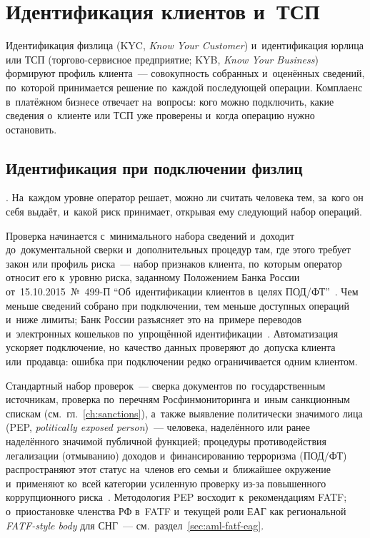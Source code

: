 
\chapter{Идентификация клиентов и~ТСП}\label{ch:kyc-kyb}
Идентификация физлица (KYC, \textit{Know Your Customer}) и~идентификация юрлица
или ТСП (торгово-сервисное предприятие; KYB, \textit{Know Your Business})
формируют профиль клиента~--- совокупность собранных и~оценённых сведений,
по~которой принимается решение по~каждой последующей операции. Комплаенс
в~платёжном бизнесе отвечает на~вопросы: кого можно подключить, какие
сведения о~клиенте или ТСП уже проверены и~когда операцию нужно остановить.

\section{Идентификация при подключении физлиц}\label{sec:kyc-individuals}

. На~каждом
уровне оператор решает, можно ли считать человека тем, за~кого он себя выдаёт,
и~какой риск принимает, открывая ему следующий набор операций.

Проверка начинается с~минимального набора сведений и~доходит до~документальной
сверки и~дополнительных процедур там, где этого требует закон или профиль
риска~---
набор признаков клиента, по~которым оператор относит его к~уровню риска,
заданному Положением Банка России от~15.10.2015~№~499-П
\enquote{Об~идентификации клиентов в~целях ПОД/ФТ}~\cite{cbr-499p}. Чем меньше
сведений собрано при подключении, тем меньше доступных операций и~ниже лимиты;
Банк России разъясняет это на~примере переводов и~электронных кошельков
по~упрощённой идентификации~\cite{cbr-banking-faq-identification}.
Автоматизация ускоряет подключение, но~качество данных проверяют
до~допуска клиента или~продавца: ошибка при подключении редко ограничивается
одним клиентом.

Стандартный набор проверок~--- сверка документов по~государственным источникам,
проверка по~перечням Росфинмониторинга и~иным санкционным спискам
(см.~гл.~\ref{ch:sanctions}), а~также выявление политически значимого лица
(PEP, \textit{politically exposed person})~--- человека, наделённого или ранее
наделённого значимой публичной функцией; процедуры противодействия
легализации (отмыванию) доходов и~финансированию терроризма (ПОД/ФТ)
распространяют этот статус на~членов его семьи и~ближайшее окружение
и~применяют ко~всей категории усиленную проверку из-за повышенного коррупционного
риска~\cite{cbr-499p,fatf-pep-guidance}. Методология PEP восходит
к~рекомендациям FATF; о~приостановке членства РФ в~FATF и~текущей роли ЕАГ как
региональной \textit{FATF-style body} для СНГ~---
см.~раздел~\ref{sec:aml-fatf-eag}.

